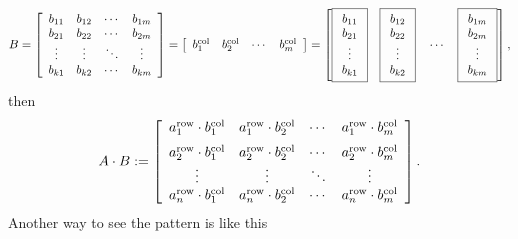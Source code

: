 \begin{equation}
   B= \left[\begin{array}{cccc} b_{11}& b_{12}& \cdots & b_{1m} \\
 b_{21}& b_{22}& \cdots & b_{2m}  \\
 \vdots & \vdots&  \ddots & \vdots \\
 b_{k1}& b_{k2}& \cdots & b_{km} 
 \end{array}\right] =
\left[\begin{array}{cccc} b_1^{\rm col} & b_2^{\rm col} & \cdots & b_m^{\rm col}\end{array}\right]  = \left[ \boxed{\begin{array}{c} b_{11} \\ b_{21}\\ \vdots \\ b_{k1}\end{array} }~~~
\boxed{\begin{array}{c} b_{12} \\ b_{22}\\ \vdots \\ b_{k2}\end{array} }~~~\cdots~~~
\boxed{\begin{array}{c} b_{1m} \\ b_{2m}\\ \vdots \\ b_{km}\end{array} }\right],
\end{equation}
then
\begin{equation}
   A \cdot B:= 
\left[\begin{array}{cccc}  a_1^{\rm row} \cdot b_1^{\rm col} & a_1^{\rm row} \cdot b_2^{\rm col} & \cdots & a_1^{\rm row} \cdot b_m^{\rm col} \medskip  \\
a_2^{\rm row} \cdot b_1^{\rm col} & a_2^{\rm row} \cdot b_2^{\rm col} & \cdots & a_2^{\rm row} \cdot b_m^{\rm col} \\
\vdots & \vdots & \ddots & \vdots \\
a_n^{\rm row} \cdot b_1^{\rm col} & a_n^{\rm row} \cdot b_2^{\rm col} & \cdots & a_n^{\rm row} \cdot b_m^{\rm col}
\end{array}\right].
\end{equation}
Another way to see the pattern is like this
